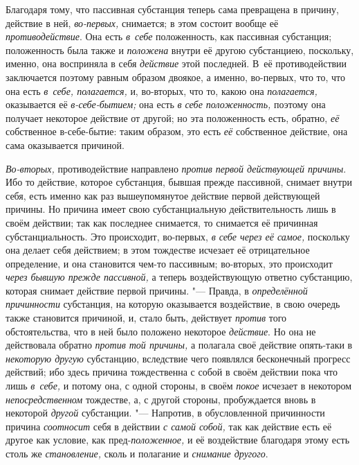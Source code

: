 Благодаря тому, что пассивная субстанция теперь сама превращена в причину,
действие в ней, {\em во-первых,} снимается; в этом
состоит вообще её {\em противодействие}. Она есть
{\em в~себе} положенность, как пассивная субстанция;
положенность была также и {\em положена} внутри её
другою субстанциею, поскольку, именно, она восприняла в себя
{\em действие} этой последней. В~её противодействии
заключается поэтому равным образом двоякое, а именно, во-первых, что то,
что она есть {\em в~себе, полагается,} и, во-вторых, что то, какою она
{\em полагается,} оказывается её {\em в-себе-бытием;} она есть
{\em в себе положенность,} поэтому она получает
некоторое действие от другой; но эта положенность есть, обратно,
{\em её} собственное в-себе-бытие: таким образом, это
есть {\em её} собственное действие, она сама оказывается причиной.

{\em Во-вторых,} противодействие направлено
{\em против первой действующей причины}. Ибо то
действие, которое субстанция, бывшая прежде пассивной, снимает внутри себя,
есть именно как раз вышеупомянутое действие первой действующей причины. Но
причина имеет свою субстанциальную действительность лишь в своём действии;
так как последнее снимается, то снимается её причинная субстанциальность.
Это происходит, во-первых, {\em в себе через её самое,}
поскольку она делает себя действием; в этом тождестве исчезает её
отрицательное определение, и она становится чем-то пассивным; во-вторых,
это происходит {\em через бывшую прежде пассивной,} а
теперь воздействующую ответно субстанцию, которая снимает действие первой
причины. "--- Правда, в {\em определённой причинности}
субстанция, на которую оказывается воздействие, в свою очередь также
становится причиной, и, стало быть, действует
{\em против} того обстоятельства, что в ней было
положено некоторое {\em действие}. Но она не
действовала обратно {\em против той причины,} а
полагала своё действие опять-таки в {\em некоторую
другую} субстанцию, вследствие чего появлялся бесконечный прогресс
действий; ибо здесь причина тождественна с собой в своём действии пока что
лишь {\em в~себе,} и потому она, с одной стороны, в
своём {\em покое} исчезает в некотором
{\em непосредственном} тождестве, а, с другой стороны,
пробуждается вновь в некоторой {\em другой} субстанции.
"--- Напротив, в обусловленной причинности причина
{\em соотносит} себя в действии
{\em с самой собой,} так как действие есть её другое
как условие, как пред-{\em положенное,} и её
воздействие благодаря этому есть столь же
{\em становление,} сколь и полагание и {\em снимание другого}.

